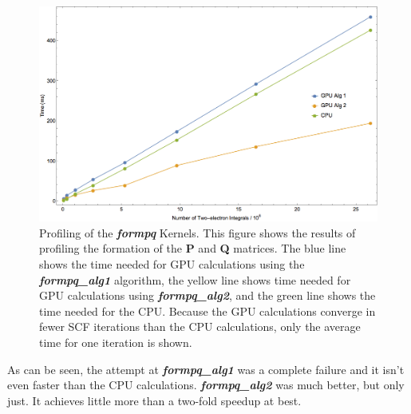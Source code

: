 \documentclass[12pt]{report}
\newcommand{\kernel}[1]{\textit{\textbf{#1}}}
\begin{document}
\begin{figure}[h!]
\includegraphics[width=1\textwidth]{Figures/formpqprof.png}
\caption[Profiling of the \kernel{formpq} Kernels.]
{Profiling of the \kernel{formpq} Kernels. This figure shows the results of profiling the formation of the \textbf{P} and \textbf{Q} matrices. The blue line shows the time needed for GPU calculations using the \kernel{formpq\_alg1} algorithm, the yellow line shows time needed for GPU calculations using \kernel{formpq\_alg2}, and the green line shows the time needed for the CPU. Because the GPU calculations converge in fewer SCF iterations than the CPU calculations, only the average time for one iteration is shown.}
\label{fig:formpqprof}
\end{figure}

As can be seen, the attempt at \kernel{formpq\_alg1} was a complete failure and it isn't even faster than the CPU calculations. \kernel{formpq\_alg2} was much better, but only just. It achieves little more than a two-fold speedup at best. 
\end{document}
